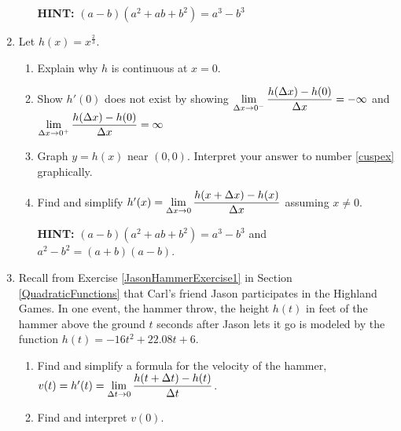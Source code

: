 \begin{enumerate}
\begin{enumerate}
\smallskip

\textbf{HINT:}  $(a-b)\left(a^2+ab+b^2\right) = a^3 - b^3$ 
        
\smallskip

\end{enumerate}

\item Let  $h(x) = x^{\frac{2}{3}}$.  

\begin{enumerate}

\item Explain why $h$ is continuous at $x = 0$.

\item\label{cuspex} Show $h'(0)$ does not exist by showing $\displaystyle{\lim_{\Delta x \rightarrow 0^{-}} \dfrac{h(\Delta x) - h(0)}{\Delta x} = -\infty}$ and $\displaystyle{\lim_{\Delta x \rightarrow 0^{+}} \dfrac{h(\Delta x) - h(0)}{\Delta x} = \infty}$

\smallskip
        
\item  Graph $y = h(x)$ near $(0,0)$.  Interpret your answer to number \ref{cuspex} graphically.

\smallskip

\item  Find and simplify  $h'(x) =  \displaystyle{\lim_{\Delta x \rightarrow 0} \dfrac{h(x+\Delta x) - h(x)}{\Delta x}}$ assuming $x \neq 0$.

\smallskip

\textbf{HINT:}  $(a-b)\left(a^2+ab+b^2\right) = a^3 - b^3$ and $a^2 - b^2 = (a+b)(a-b)$.
        
\smallskip

\end{enumerate}

\item  Recall from Exercise \ref{JasonHammerExercise1} in Section \ref{QuadraticFunctions} that Carl's friend Jason participates in the Highland Games. In one event, the hammer throw, the height $h(t)$ in feet of the hammer above the ground $t$ seconds after Jason lets it go is modeled by the function $h(t) = -16t^2 +  22.08t + 6$. 

\begin{enumerate}

\item  Find and simplify a formula for the velocity of the hammer, $v(t) = h'(t) = \displaystyle{\lim_{\Delta t \rightarrow 0} \dfrac{h(t + \Delta t) - h(t)}{\Delta t}}$.

\item  Find and interpret $v(0)$.


\end{enumerate}
\end{enumerate}
